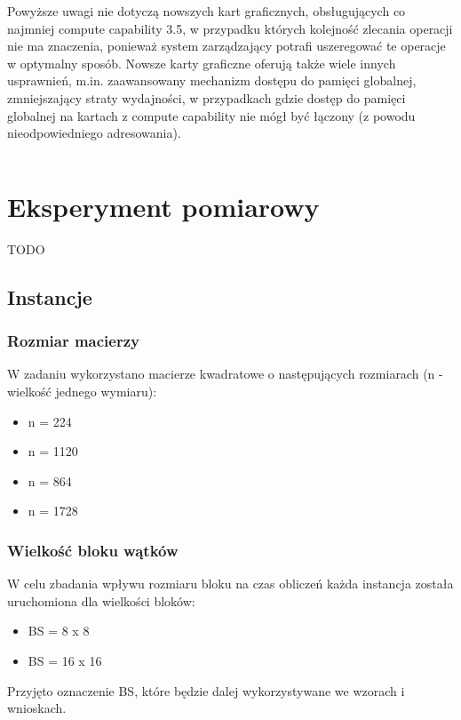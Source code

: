 \documentclass[12pt,a4paper]{article}
\begin{document}
Powyższe uwagi nie dotyczą nowszych kart graficznych, obsługujących co najmniej compute capability 3.5, w przypadku których kolejność zlecania operacji nie ma znaczenia, ponieważ system zarządzający potrafi uszeregować te operacje w optymalny sposób. Nowsze karty graficzne oferują także wiele innych usprawnień, m.in. zaawansowany mechanizm dostępu do pamięci globalnej, zmniejszający straty wydajności, w przypadkach gdzie dostęp do pamięci globalnej na kartach z compute capability nie mógł być łączony (z powodu nieodpowiedniego adresowania).


\begin{listing}[H]
\inputminted{cuda}{listings/invocation_async.cu}
\caption{Wywołanie kernela, wersja 5, zrównoleglenie obliczeń i transferu danych}
\label{lst:async}
\end{listing}


\section{Eksperyment pomiarowy}
TODO

\subsection{Instancje}

\subsubsection*{Rozmiar macierzy}
W zadaniu wykorzystano macierze kwadratowe o następujących rozmiarach (n - wielkość jednego wymiaru):
\begin{itemize}
\item n = 224
\item n = 1120
\item n = 864
\item n = 1728
\end{itemize}

\subsubsection*{Wielkość bloku wątków}

W celu zbadania wpływu rozmiaru bloku na czas obliczeń każda instancja została uruchomiona dla wielkości bloków:
\begin{itemize}
\item BS = 8 x 8
\item BS = 16 x 16
\end{itemize}
{\footnotesize Przyjęto oznaczenie BS, które będzie dalej wykorzystywane we wzorach i wnioskach.}
\end{document}
